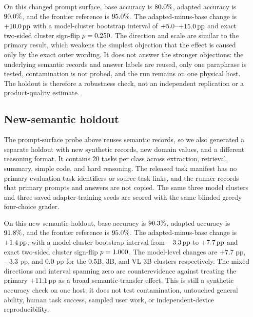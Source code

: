 \documentclass[conference]{IEEEtran}
\newcommand{\pp}{\,\text{pp}}
\begin{document}
On this changed prompt surface, base accuracy is
$80.0\%$, adapted accuracy is
$90.0\%$, and the frontier reference is
$95.0\%$. The adapted-minus-base change is
$+\AdaptationHoldoutUplift\pp$ with a model-cluster bootstrap interval of
$+5.0$--$+\AdaptationHoldoutUpliftHigh\pp$ and exact
two-sided cluster sign-flip $p=0.250$. The direction and
scale are similar to the primary result, which weakens the simplest objection
that the effect is caused only by the exact outer wording. It does not answer
the stronger objections: the underlying semantic records and answer labels
are reused, only one paraphrase is tested, contamination is not probed, and
the run remains on one physical host. The holdout is therefore a robustness
check, not an independent replication or a product-quality estimate.

\subsection{New-semantic holdout}

The prompt-surface probe above reuses semantic records, so we also generated
a separate holdout with new synthetic records, new domain values, and a
different reasoning format. It contains 20 tasks per class across extraction,
retrieval, summary, simple code, and hard reasoning. The released task
manifest has no primary evaluation task identifiers or source-task links, and
the runner records that primary prompts and answers are not copied. The same
three model clusters and three saved adapter-training seeds are scored with
the same blinded greedy four-choice grader.

On this new semantic holdout, base accuracy is
$90.3\%$, adapted accuracy is
$91.8\%$, and the frontier reference is
$95.0\%$. The adapted-minus-base change is
$+\AdaptationSemanticUplift\pp$, with a model-cluster bootstrap interval from
$\AdaptationSemanticUpliftLow\pp$ to
$+\AdaptationSemanticUpliftHigh\pp$ and exact two-sided cluster sign-flip
$p=1.000$. The model-level changes are $+7.7$ pp,
$-3.3$ pp, and $0.0$ pp for the 0.5B, 3B, and VL 3B clusters respectively.
The mixed directions and interval spanning zero are counterevidence against
treating the primary $+11.1\pp$ as a broad semantic-transfer effect. This is
still a synthetic accuracy check on one host; it does not test contamination,
untouched general ability, human task success, sampled user work, or
independent-device reproducibility.
\end{document}
